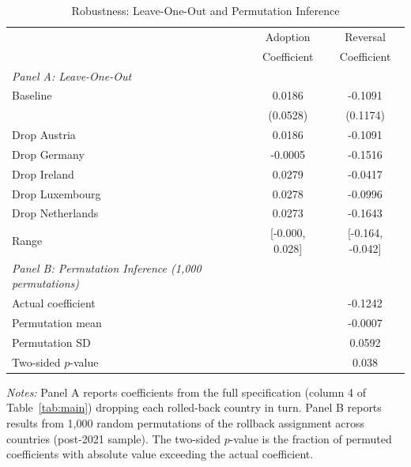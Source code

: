 \begin{table}[t]
\centering
\begin{threeparttable}
\caption{Robustness: Leave-One-Out and Permutation Inference}
\label{tab:robust}
\begin{tabular}{lcc}
\toprule
 & Adoption & Reversal \\
 & Coefficient & Coefficient \\
\midrule
\textit{Panel A: Leave-One-Out} & & \\
Baseline & 0.0186 & -0.1091 \\
 & (0.0528) & (0.1174) \\
Drop Austria & 0.0186 & -0.1091 \\
Drop Germany & -0.0005 & -0.1516 \\
Drop Ireland & 0.0279 & -0.0417 \\
Drop Luxembourg & 0.0278 & -0.0996 \\
Drop Netherlands & 0.0273 & -0.1643 \\
Range & [-0.000, 0.028] & [-0.164, -0.042] \\
\midrule
\textit{Panel B: Permutation Inference (1,000 permutations)} & & \\
Actual coefficient & & -0.1242 \\
Permutation mean & & -0.0007 \\
Permutation SD & & 0.0592 \\
Two-sided $p$-value & & 0.038 \\
\bottomrule
\end{tabular}
\begin{tablenotes}[flushleft]
\small
\item \textit{Notes:} Panel A reports coefficients from the full specification (column 4 of Table~\ref{tab:main}) dropping each rolled-back country in turn. Panel B reports results from 1,000 random permutations of the rollback assignment across countries (post-2021 sample). The two-sided $p$-value is the fraction of permuted coefficients with absolute value exceeding the actual coefficient.
\end{tablenotes}
\end{threeparttable}
\end{table}
